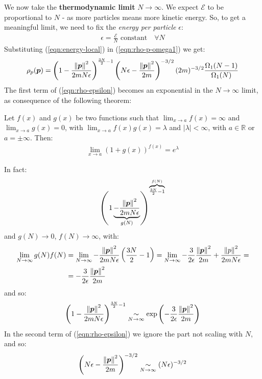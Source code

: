 \documentclass[../template.tex]{subfiles}
\begin{document}
We now take the \textbf{thermodynamic limit} $N \to \infty$. We expect $\mathcal{E}$ to be proportional to $N$ - as more particles means more kinetic energy. So, to get a meaningful limit, we need to fix the \textit{energy per particle}  $\epsilon$:
\begin{align}
    \epsilon = \frac{\mathcal{E}}{N} \text{ constant} \quad \forall N  \label{eqn:energy-local}
\end{align}
Substituting (\ref{eqn:energy-local}) in (\ref{eqn:rho-p-omega1}) we get:
\begin{align}\label{eqn:rho-epsilon}
    \rho_p(\bm{p}) =  \left(1-\frac{\norm{\bm{p}}^2}{2mN\epsilon} \right)^{\frac{3N}{2}-1} \left(N\epsilon-\frac{\norm{\bm{p}}^2}{2m} \right)^{-3/2} (2m)^{-3/2} \frac{\Omega_1(N-1)}{\Omega_1(N)}
\end{align} 
The first term of (\ref{eqn:rho-epsilon}) becomes an exponential in the $N \to \infty$ limit, as consequence of the following theorem:

\begin{thm}
    Let $f(x)$ and $g(x)$ be two functions such that $\lim_{x \to a} f(x) = \infty $ and $\lim_{x \to a} g(x) = 0$, with $\lim_{x \to a} f(x) g(x) = \lambda$ and $|\lambda | < \infty$, with $a \in \mathbb{R}$ or $a = \pm \infty$. Then:
\begin{align*}
    \lim_{x \to a} (1+g(x))^{f(x)} = e^{\lambda}
\end{align*}
\end{thm}

In fact:
\begin{align*}
    \left(1\underbrace{-\frac{\norm{\bm{p}}^2}{2mN\epsilon}}_{g(N)} \right)^{\overbrace{\scriptstyle \frac{3N}{2}-1}^{f(N)}} 
\end{align*}
and $g(N) \to 0$, $f(N) \to \infty$, with:
\begin{align*}
    \lim_{N \to \infty} g(N) f(N) &= \lim_{N \to\infty } -\frac{\norm{\bm{p}}^2}{2 m N \epsilon}\left(\frac{3N}{2} -1\right) = \lim_{N \to \infty} -\frac{3}{2\epsilon} \frac{\norm{\bm{p}}^2}{2 m} + \frac{\norm{p}^2}{2m N \epsilon} =\\
    &= -\frac{3}{2\epsilon} \frac{\norm{\bm{p}}^2}{2 m}
\end{align*}
and so:
\begin{align*}
    \left(1-\frac{\norm{\bm{p}}^2}{2mN\epsilon} \right)^{\frac{3N}{2}-1}  \underset{N \to \infty}{\sim}  \exp\left(-\frac{3}{2 \epsilon} \frac{\norm{\bm{p}}^2}{2m} \right) 
\end{align*}
In the second term of (\ref{eqn:rho-epsilon}) we ignore the part not scaling with $N$, and so:
\begin{align*}
    \left(N\epsilon-\frac{\norm{\bm{p}}^2}{2m} \right)^{-3/2} \underset{N \to \infty}{\sim}  (N \epsilon)^{-3/2}
\end{align*}
\end{document}
